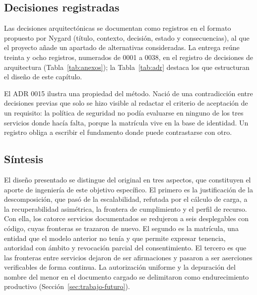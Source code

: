\subsection{Decisiones registradas}
\label{sec:adr}

Las decisiones arquitectónicas se documentan como registros en el formato propuesto por
Nygard \citep{nygard_documenting_2011} (título, contexto, decisión, estado y consecuencias),
al que el proyecto añade un apartado de alternativas consideradas. La entrega reúne
treinta y ocho registros, numerados de 0001 a 0038, en el registro de decisiones de
arquitectura (Tabla~\ref{tab:anexos}); la Tabla~\ref{tab:adr} destaca los que estructuran el
diseño de este capítulo.

El ADR 0015 ilustra una propiedad del método. Nació de una contradicción entre decisiones previas
que solo se hizo visible al redactar el criterio de aceptación de un requisito: la política de
seguridad no podía evaluarse en ninguno de los tres servicios donde hacía falta, porque la
matrícula vive en la base de identidad. Un registro obliga a escribir el fundamento donde puede
contrastarse con otro.



\subsection{Síntesis}

El diseño presentado se distingue del original en tres aspectos, que constituyen el aporte
de ingeniería de este objetivo específico. El primero es la justificación de la
descomposición, que pasó de la escalabilidad, refutada por el cálculo de carga, a la
recuperabilidad asimétrica, la frontera de cumplimiento y el perfil de recurso. Con ella,
los catorce servicios documentados se redujeron a seis desplegables con código, cuyas
fronteras se trazaron de nuevo. El segundo es la matrícula, una entidad que el modelo
anterior no tenía y que permite expresar tenencia, autoridad con ámbito y revocación
parcial del consentimiento. El tercero es que las fronteras entre servicios dejaron de ser
afirmaciones y pasaron a ser aserciones verificables de forma continua. La autorización
uniforme y la depuración del nombre del menor en el documento cargado se delimitaron como
endurecimiento productivo (Sección~\ref{sec:trabajo-futuro}).
